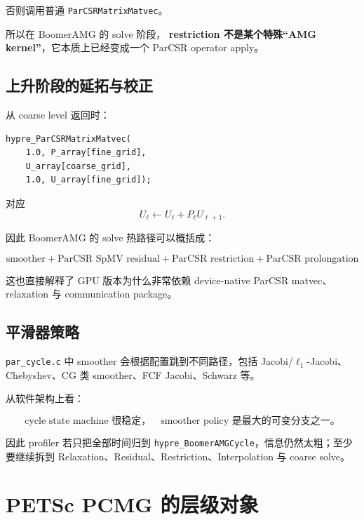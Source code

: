 否则调用普通 \texttt{ParCSRMatrixMatvec}。

所以在 BoomerAMG 的 solve 阶段，
\textbf{restriction 不是某个特殊“AMG kernel”}，它本质上已经变成一个 ParCSR operator apply。

\subsection{上升阶段的延拓与校正}

从 coarse level 返回时：

\begin{verbatim}
hypre_ParCSRMatrixMatvec(
    1.0, P_array[fine_grid],
    U_array[coarse_grid],
    1.0, U_array[fine_grid]);
\end{verbatim}

对应
\begin{equation}
U_\ell
\leftarrow
U_\ell+P_\ell U_{\ell+1}.
\end{equation}

因此 BoomerAMG 的 solve 热路径可以概括成：

\begin{equation}
\boxed{
\text{smoother}
+
\text{ParCSR SpMV residual}
+
\text{ParCSR restriction}
+
\text{ParCSR prolongation}
}
\label{eq:software-hypre-solve-core}
\end{equation}

这也直接解释了 GPU 版本为什么非常依赖 device-native ParCSR matvec、relaxation 与 communication package。

\subsection{平滑器策略}

\texttt{par\_cycle.c} 中 smoother 会根据配置跳到不同路径，包括
Jacobi/\(\ell_1\)-Jacobi、Chebyshev、CG 类 smoother、FCF Jacobi、Schwarz 等。

从软件架构上看：

\begin{equation}
\boxed{
\text{cycle state machine 很稳定，}
\quad
\text{smoother policy 是最大的可变分支之一。}
}
\end{equation}

因此 profiler 若只把全部时间归到
\texttt{hypre\_BoomerAMGCycle}，信息仍然太粗；至少要继续拆到
Relaxation、Residual、Restriction、Interpolation 与 coarse solve。

\section{PETSc PCMG 的层级对象}
\label{sec:software-petsc-source}

